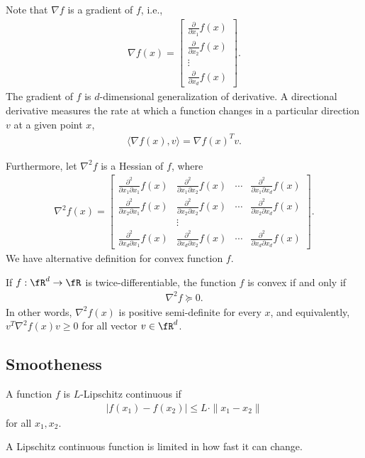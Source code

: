 \documentclass{article}
\begin{document}
Note that $\nabla f$ is a gradient of $f$, i.e.,
\begin{align}
    \nabla f(x) = \begin{bmatrix}
        \frac{\partial}{\partial x_1} f(x)\\
        \frac{\partial}{\partial x_2} f(x)\\
        \vdots \\
        \frac{\partial}{\partial x_d} f(x)
    \end{bmatrix}.
\end{align}
The gradient of $f$ is $d$-dimensional generalization of derivative.
A directional derivative measures the rate at which a function changes in a particular direction $v$ at a given point $x$,
\begin{align}
    \langle \nabla f (x) , v\rangle = \nabla f(x)^T v.
\end{align}


Furthermore, let $\nabla^2 f$ is a Hessian of $f$, where
\begin{align}
    \nabla^2 f(x) = \begin{bmatrix}
        \frac{\partial^2}{\partial x_1\partial x_1} f(x)& \frac{\partial^2}{\partial x_1\partial x_2} f(x)& \cdots & \frac{\partial^2}{\partial x_1\partial x_d} f(x)\\
        \frac{\partial^2}{\partial x_2\partial x_1} f(x)& \frac{\partial^2}{\partial x_2\partial x_2} f(x)& \cdots & \frac{\partial^2}{\partial x_2\partial x_d} f(x)\\
        & \vdots & & \\
        \frac{\partial^2}{\partial x_d\partial x_1} f(x)& \frac{\partial^2}{\partial x_d\partial x_2} f(x)& \cdots & \frac{\partial^2}{\partial x_d\partial x_d} f(x)
    \end{bmatrix}.
\end{align}
We have alternative definition for convex function $f$.
\begin{theorem}
        If $f:\fR^d \rightarrow \fR$ is twice-differentiable, the function $f$ is convex if and only if
        \begin{align}
            \nabla^2 f \succeq 0.
        \end{align}
        In other words, $\nabla^2f(x)$ is positive semi-definite for every $x$, and equivalently, $v^T \nabla^2 f(x) v \geq 0$ for all vector $v\in\fR^d$.
\end{theorem}


\subsection{Smootheness}
\begin{definition}
    A function $f$ is $L$-Lipschitz continuous if
    \begin{align}
        |f(x_1) - f(x_2)| \leq L \cdot \|x_1-x_2\|
    \end{align}
    for all $x_1, x_2$.
\end{definition}
A Lipschitz continuous function is limited in how fast it can change.
\end{document}
